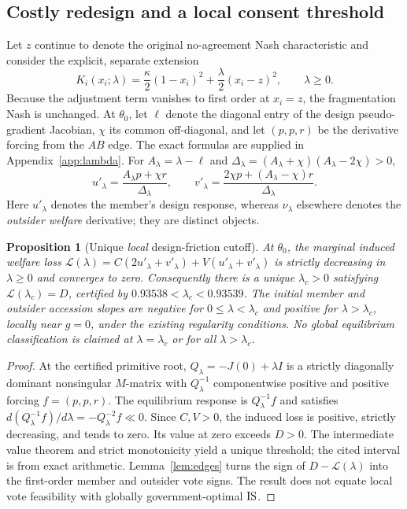 \documentclass[11pt,a4paper]{article}
\newtheorem{proposition}[theorem]{Proposition}
\theoremstyle{remark}\newtheorem{remark}[theorem]{Remark}
\newcommand{\loss}{\mathcal L}\newcommand{\vect}[1]{\boldsymbol{#1}}
\begin{document}
\subsection{Costly redesign and a local consent threshold}
Let $z$ continue to denote the original no-agreement Nash characteristic and consider the explicit, separate extension
\begin{equation}\label{eq:lambda}
K_i(x_i;\lambda)=\frac{\kappa}{2}(1-x_i)^2+\frac{\lambda}{2}(x_i-z)^2,\qquad \lambda\ge0.
\end{equation}
Because the adjustment term vanishes to first order at $x_i=z$, the fragmentation Nash is unchanged. At $\theta_0$, let $\ell$ denote the diagonal entry of the design pseudo-gradient Jacobian, $\chi$ its common off-diagonal, and let $(p,p,r)$ be the derivative forcing from the $AB$ edge. The exact formulas are supplied in Appendix~\ref{app:lambda}. For $A_\lambda=\lambda-\ell$ and $\Delta_\lambda=(A_\lambda+\chi)(A_\lambda-2\chi)>0$,
\begin{equation}\label{eq:lambdaResp}
u'_\lambda=\frac{A_\lambda p+\chi r}{\Delta_\lambda},\qquad
v'_\lambda=\frac{2\chi p+(A_\lambda-\chi)r}{\Delta_\lambda}.
\end{equation}
Here $u'_\lambda$ denotes the member's design response, whereas $\nu_\lambda$ elsewhere denotes the \emph{outsider welfare} derivative; they are distinct objects.

\begin{proposition}[Unique \emph{local} design-friction cutoff]\label{prop:lambda}
At $\theta_0$, the marginal induced welfare loss $\loss(\lambda)=C(2u'_\lambda+v'_\lambda)+V(u'_\lambda+v'_\lambda)$ is strictly decreasing in $\lambda\ge0$ and converges to zero. Consequently there is a unique $\lambda_c>0$ satisfying $\loss(\lambda_c)=D$, certified by $0.93538<\lambda_c<0.93539$. The initial member and outsider accession slopes are negative for $0\le\lambda<\lambda_c$ and positive for $\lambda>\lambda_c$, locally near $g=0$, under the existing regularity conditions. No global equilibrium classification is claimed at $\lambda=\lambda_c$ or for all $\lambda>\lambda_c$.
\end{proposition}
\begin{proof}
At the certified primitive root, $Q_\lambda=-J(0)+\lambda I$ is a strictly diagonally dominant nonsingular $M$-matrix with $Q_\lambda^{-1}$ componentwise positive and positive forcing $f=(p,p,r)$. The equilibrium response is $Q_\lambda^{-1}f$ and satisfies $d(Q_\lambda^{-1}f)/d\lambda=-Q_\lambda^{-2}f\ll0$. Since $C,V>0$, the induced loss is positive, strictly decreasing, and tends to zero. Its value at zero exceeds $D>0$. The intermediate value theorem and strict monotonicity yield a unique threshold; the cited interval is from exact arithmetic. Lemma~\ref{lem:edges} turns the sign of $D-\loss(\lambda)$ into the first-order member and outsider vote signs. The result does not equate local vote feasibility with globally government-optimal $\mathrm{IS}$.
\end{proof}
\end{document}
